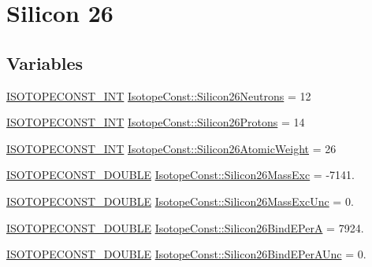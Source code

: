 \hypertarget{group___isotope_const-_silicon-_si26}{}\section{Silicon 26}
\label{group___isotope_const-_silicon-_si26}
\subsection*{Variables}
\begin{DoxyCompactItemize}
\item 
\mbox{\hyperlink{group___isotope_const-_macros_ga5f18360b3e99483a35c32d789e62621c}{I\+S\+O\+T\+O\+P\+E\+C\+O\+N\+S\+T\+\_\+\+I\+NT}} \mbox{\hyperlink{group___isotope_const-_silicon-_si26_ga7adfb1676b08516aa954b4d061fdf6f9}{Isotope\+Const\+::\+Silicon26\+Neutrons}} = 12
\item 
\mbox{\hyperlink{group___isotope_const-_macros_ga5f18360b3e99483a35c32d789e62621c}{I\+S\+O\+T\+O\+P\+E\+C\+O\+N\+S\+T\+\_\+\+I\+NT}} \mbox{\hyperlink{group___isotope_const-_silicon-_si26_gab6733b350ae19180b42fced87aaba6c1}{Isotope\+Const\+::\+Silicon26\+Protons}} = 14
\item 
\mbox{\hyperlink{group___isotope_const-_macros_ga5f18360b3e99483a35c32d789e62621c}{I\+S\+O\+T\+O\+P\+E\+C\+O\+N\+S\+T\+\_\+\+I\+NT}} \mbox{\hyperlink{group___isotope_const-_silicon-_si26_gafc5112fcc52c598211a52c0da7d2db6c}{Isotope\+Const\+::\+Silicon26\+Atomic\+Weight}} = 26
\item 
\mbox{\hyperlink{group___isotope_const-_macros_ga8f45a7272ce02c0b4c65c44636ed719a}{I\+S\+O\+T\+O\+P\+E\+C\+O\+N\+S\+T\+\_\+\+D\+O\+U\+B\+LE}} \mbox{\hyperlink{group___isotope_const-_silicon-_si26_gac19519775f032979c674b3c4b06617ff}{Isotope\+Const\+::\+Silicon26\+Mass\+Exc}} = -\/7141.
\item 
\mbox{\hyperlink{group___isotope_const-_macros_ga8f45a7272ce02c0b4c65c44636ed719a}{I\+S\+O\+T\+O\+P\+E\+C\+O\+N\+S\+T\+\_\+\+D\+O\+U\+B\+LE}} \mbox{\hyperlink{group___isotope_const-_silicon-_si26_ga336b3107286d51287d3fdee7234219a3}{Isotope\+Const\+::\+Silicon26\+Mass\+Exc\+Unc}} = 0.
\item 
\mbox{\hyperlink{group___isotope_const-_macros_ga8f45a7272ce02c0b4c65c44636ed719a}{I\+S\+O\+T\+O\+P\+E\+C\+O\+N\+S\+T\+\_\+\+D\+O\+U\+B\+LE}} \mbox{\hyperlink{group___isotope_const-_silicon-_si26_ga50e8b190aa4b4eac4a82fd0ed543f824}{Isotope\+Const\+::\+Silicon26\+Bind\+E\+PerA}} = 7924.
\item 
\mbox{\hyperlink{group___isotope_const-_macros_ga8f45a7272ce02c0b4c65c44636ed719a}{I\+S\+O\+T\+O\+P\+E\+C\+O\+N\+S\+T\+\_\+\+D\+O\+U\+B\+LE}} \mbox{\hyperlink{group___isotope_const-_silicon-_si26_ga9c8d5a0df401a4278dcb35f330c16c52}{Isotope\+Const\+::\+Silicon26\+Bind\+E\+Per\+A\+Unc}} = 0.

\end{DoxyCompactItemize}
